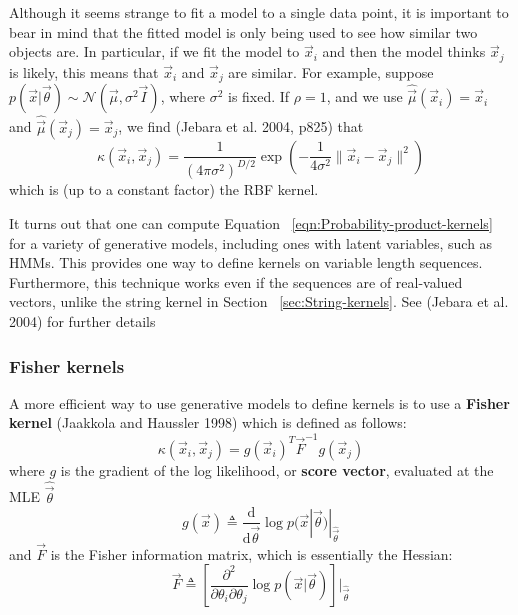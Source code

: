 Although it seems strange to fit a model to a single data point, it is important to bear in mind that the fitted model is only being used to see how similar two objects are. In particular, if we fit the model to $\vec{x}_i$ and then the model thinks $\vec{x}_j$ is likely, this means that $\vec{x}_i$ and $\vec{x}_j$ are similar. For example, suppose $p(\vec{x}|\vec{\theta}) \sim \mathcal{N}(\vec{\mu},\sigma^2\vec{I})$, where $\sigma^2$ is fixed. If $\rho=1$, and we use $\hat{\vec{\mu}}(\vec{x}_i)=\vec{x}_i$ and $\hat{\vec{\mu}}(\vec{x}_j)=\vec{x}_j$, we find (Jebara et al. 2004, p825) that
\begin{equation}
\kappa(\vec{x}_i,\vec{x}_j)=\frac{1}{(4\pi\sigma^2)^{D/2}}\exp\left(-\frac{1}{4\sigma^2}\lVert\vec{x}_i-\vec{x}_j\rVert^2\right)
\end{equation}
which is (up to a constant factor) the RBF kernel.

It turns out that one can compute Equation ~\eqref{eqn:Probability-product-kernels} for a variety of generative models, including ones with latent variables, such as HMMs. This provides one way to define kernels on variable length sequences. Furthermore, this technique works even if the sequences are of real-valued vectors, unlike the string kernel in Section ~\ref{sec:String-kernels}. See (Jebara et al. 2004) for further details


\subsubsection{Fisher kernels}
A more efficient way to use generative models to define kernels is to use a \textbf{Fisher kernel} (Jaakkola and Haussler 1998) which is defined as follows:
\begin{equation}
\kappa(\vec{x}_i,\vec{x}_j)=g(\vec{x}_i)^T\vec{F}^{-1}g(\vec{x}_j)
\end{equation}
where $g$ is the gradient of the log likelihood, or \textbf{score vector}, evaluated at the MLE $\hat{\vec{\theta}}$
\begin{equation}
g(\vec{x}) \triangleq \frac{\mathrm{d}}{\mathrm{d}\vec{\theta}}\log p(\vec{x}|\vec{\theta})|_{\hat{\vec{\theta}}}
\end{equation}
and $\vec{F}$ is the Fisher information matrix, which is essentially the Hessian:
\begin{equation}
\vec{F} \triangleq \left[\frac{\partial^2}{\partial \theta_i \partial \theta_j}\log p(\vec{x}|\vec{\theta})\right]|_{\hat{\vec{\theta}}}
\end{equation}

